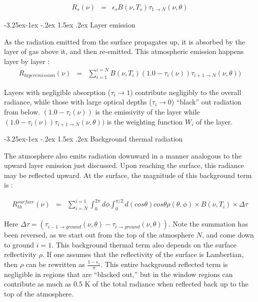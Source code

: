 \documentclass[11pt]{article}
\makeatletter
\renewcommand{\subsection}{\@startsection{subsection}{2}{\z@}%
                                     {-3.25ex\@plus -1ex \@minus -.2ex}%
                                     {1.5ex \@plus .2ex}%
                                     {\reset@font\normalsize\bfseries}}
\makeatother
\begin{document}
\begin{eqnarray*}
R_{s}(\nu) & = & \epsilon_{s} B(\nu,T_{s}) \tau_{1 \rightarrow N}(\nu,\theta)
\end{eqnarray*}

\subsection{Layer emission}

As the radiation emitted from the surface propagates up, it is absorbed by
the layer of gas above it, and then re-emitted. This atmospheric emission
happens layer by layer :
\begin{eqnarray*}
R_{layer emission}(\nu) & = & \sum_{i=1}^{i=N} B(\nu,T_{i})
(1.0 - \tau_{i}(\nu)) \tau_{i+1 \rightarrow N}(\nu,\theta))
\end{eqnarray*}

Layers with negligible absorption ($\tau_{i} \rightarrow 1$) contribute
negligibly to the overall radiance, while those with large optical depths
 ($\tau_{i} \rightarrow 0$) ``black'' out radiation from below.
$(1.0 - \tau_{i}(\nu))$ is the emissivity of the layer while
$(1.0 - \tau_{i}(\nu)) \tau_{i+1 \rightarrow N}(\nu,\theta))$ is the weighting
function $W_{i}$ of the layer.

\subsection{Background thermal radiation}

The atmosphere also emits radiation downward in a manner analogous to the
upward layer emission just discussed. Upon reaching the surface, this
radiance may be reflected upward. At the surface, the magnitude of this
background term is :

\begin{eqnarray}
R_{th}^{surface}(\nu) & = & \sum_{i=N}^{i=1}
\int_{0}^{2\pi}d\phi
\int_{0}^{\pi/2} d(cos\theta) cos\theta \rho(\theta,\phi)
\times B(\nu,T_{i}) \times \Delta \tau
\label{bckgnd_eqn}
\end{eqnarray}

\noindent Here $ \Delta \tau = (\tau_{i-1 \rightarrow ground}(\nu,\theta)-
 \tau_{i \rightarrow ground}(\nu,\theta))$.
Note the summation has been reversed, as we start out from the top of the
atmosphere $N$, and come down to ground $i=1$.
This background thermal term also depends on the surface reflectivity $\rho$.
If one assumes that the reflectivity of the surface is Lambertian, then $\rho$
can be rewritten as $\frac{1 - \epsilon_{s}}{\pi}$. This entire background
reflected term is negligible in regions that are ``blacked out,'' but in
the window regions can contribute as much as 0.5 K of the total radiance when
reflected back up to the top of the atmosphere.
\end{document}
